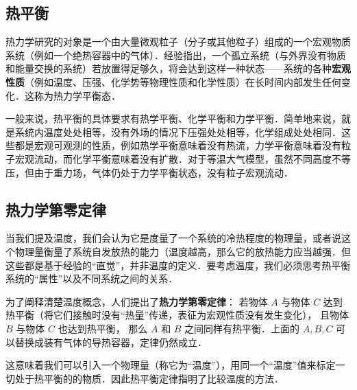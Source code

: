 
\begin{issues}
\issueDraft
\end{issues}

\subsection{热平衡}
热力学研究的对象是一个由大量微观粒子（分子或其他粒子）组成的一个宏观物质系统（例如一个绝热容器中的气体）．经验指出，一个孤立系统（与外界没有物质和能量交换的系统）若放置得足够久，将会达到这样一种状态——系统的各种\textbf{宏观性质}（例如温度、压强、化学势等物理性质和化学性质）在长时间内部发生任何变化．这称为热力学平衡态．

一般来说，热平衡的具体要求有热学平衡、化学平衡和力学平衡．简单地来说，就是系统内温度处处相等，没有外场的情况下压强处处相等，化学组成处处相同．这些都是宏观可观测的性质，例如热学平衡意味着没有热流，力学平衡意味着没有粒子宏观流动，而化学平衡意味着没有扩散．对于等温大气模型，虽然不同高度不等压，但由于重力场，气体仍处于力学平衡状态，没有粒子宏观流动．

\subsection{热力学第零定律}
当我们提及温度，我们会认为它是度量了一个系统的冷热程度的物理量，或者说这个物理量衡量了系统自发放热的能力（温度越高，那么它的放热能力应当越强．但这些都是基于经验的“直觉”，并非温度的定义．要考虑温度，我们必须思考热平衡系统的“属性”以及不同系统之间的关系．

为了阐释清楚温度概念，人们提出了\textbf{热力学第零定律}：
若物体 $A$ 与物体 $C$ 达到热平衡（将它们接触时没有“热量”传递，表征为宏观性质没有发生变化）， 且物体 $B$ 与物体 $C$ 也达到热平衡， 那么 $A$ 和 $B$ 之间同样有热平衡．上面的 $A,B,C$ 可以替换成装有气体的导热容器，定律仍然成立．

这意味着我们可以引入一个物理量（称它为“温度”），用同一个“温度”值来标定一切处于热平衡的的物质．因此热平衡定律指明了比较温度的方法．

